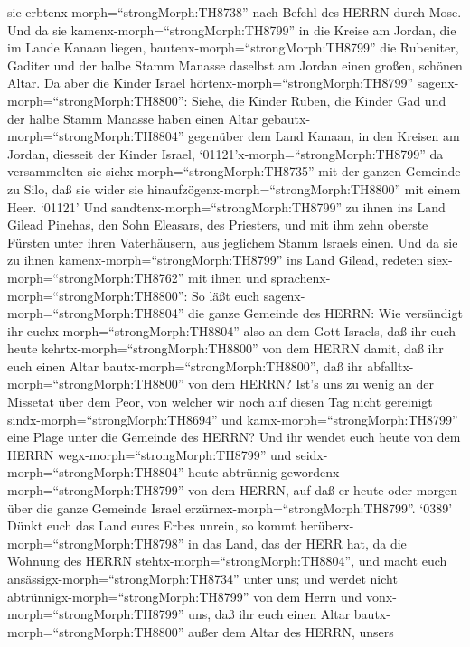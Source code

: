 sie erbtenx-morph=``strongMorph:TH8738'' nach Befehl des HERRN durch
Mose.  Und da sie kamenx-morph=``strongMorph:TH8799'' in
die Kreise am Jordan, die im Lande Kanaan liegen,
bautenx-morph=``strongMorph:TH8799'' die Rubeniter, Gaditer und der
halbe Stamm Manasse daselbst am Jordan einen großen, schönen Altar.
 Da aber die Kinder Israel
hörtenx-morph=``strongMorph:TH8799''
sagenx-morph=``strongMorph:TH8800'': Siehe, die Kinder Ruben, die Kinder
Gad und der halbe Stamm Manasse haben einen Altar
gebautx-morph=``strongMorph:TH8804'' gegenüber dem Land Kanaan, in den
Kreisen am Jordan, diesseit der Kinder Israel, 
`01121'x-morph=``strongMorph:TH8799'' da versammelten sie
sichx-morph=``strongMorph:TH8735'' mit der ganzen Gemeinde zu Silo, daß
sie wider sie hinaufzögenx-morph=``strongMorph:TH8800'' mit einem Heer.
 `01121' Und sandtenx-morph=``strongMorph:TH8799'' zu ihnen
ins Land Gilead Pinehas, den Sohn Eleasars, des Priesters, 
und mit ihm zehn oberste Fürsten unter ihren Vaterhäusern, aus jeglichem
Stamm Israels einen.  Und da sie zu ihnen
kamenx-morph=``strongMorph:TH8799'' ins Land Gilead, redeten
siex-morph=``strongMorph:TH8762'' mit ihnen und
sprachenx-morph=``strongMorph:TH8800'':  So läßt euch
sagenx-morph=``strongMorph:TH8804'' die ganze Gemeinde des HERRN: Wie
versündigt ihr euchx-morph=``strongMorph:TH8804'' also an dem Gott
Israels, daß ihr euch heute kehrtx-morph=``strongMorph:TH8800'' von dem
HERRN damit, daß ihr euch einen Altar
bautx-morph=``strongMorph:TH8800'', daß ihr
abfalltx-morph=``strongMorph:TH8800'' von dem HERRN?  Ist's
uns zu wenig an der Missetat über dem Peor, von welcher wir noch auf
diesen Tag nicht gereinigt sindx-morph=``strongMorph:TH8694'' und
kamx-morph=``strongMorph:TH8799'' eine Plage unter die Gemeinde des
HERRN?  Und ihr wendet euch heute von dem HERRN
wegx-morph=``strongMorph:TH8799'' und seidx-morph=``strongMorph:TH8804''
heute abtrünnig gewordenx-morph=``strongMorph:TH8799'' von dem HERRN,
auf daß er heute oder morgen über die ganze Gemeinde Israel
erzürnex-morph=``strongMorph:TH8799''.  `0389' Dünkt euch
das Land eures Erbes unrein, so kommt
herüberx-morph=``strongMorph:TH8798'' in das Land, das der HERR hat, da
die Wohnung des HERRN stehtx-morph=``strongMorph:TH8804'', und macht
euch ansässigx-morph=``strongMorph:TH8734'' unter uns; und werdet nicht
abtrünnigx-morph=``strongMorph:TH8799'' von dem Herrn und
vonx-morph=``strongMorph:TH8799'' uns, daß ihr euch einen Altar
bautx-morph=``strongMorph:TH8800'' außer dem Altar des HERRN, unsers
